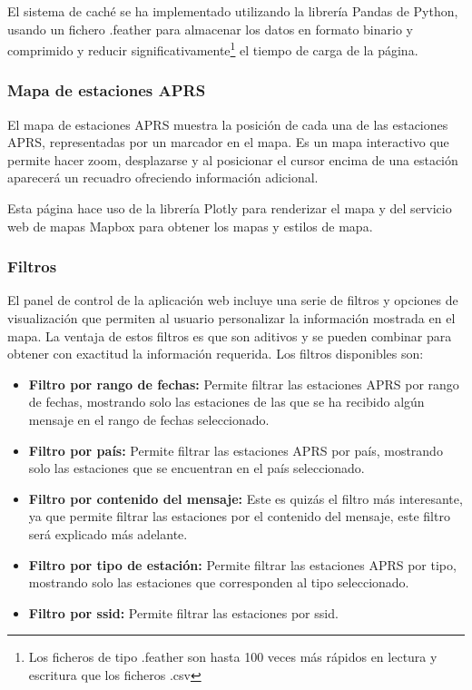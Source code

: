 El sistema de caché se ha implementado utilizando la librería Pandas de Python, usando un fichero .feather para almacenar los datos en formato binario y comprimido y reducir significativamente\footnote{Los ficheros de tipo .feather son hasta 100 veces más rápidos en lectura y escritura que los ficheros .csv\cite{CsvVsFeather}} el tiempo de carga de la página.

\subsubsection*{Mapa de estaciones APRS}

El mapa de estaciones APRS muestra la posición de cada una de las estaciones APRS, representadas por un marcador en el mapa. Es un mapa interactivo que permite hacer zoom, desplazarse y al posicionar el cursor encima de una estación aparecerá un recuadro ofreciendo información adicional.

Esta página hace uso de la librería Plotly para renderizar el mapa y del servicio web de mapas Mapbox para obtener los mapas y estilos de mapa.

\subsubsection*{Filtros}
El panel de control de la aplicación web incluye una serie de filtros y opciones de visualización que permiten al usuario personalizar la información mostrada en el mapa. La ventaja de estos filtros es que son aditivos y se pueden combinar para obtener con exactitud la información requerida. Los filtros disponibles son:

\begin{itemize}
	\item \textbf{Filtro por rango de fechas:} Permite filtrar las estaciones APRS por rango de fechas, mostrando solo las estaciones de las que se ha recibido algún mensaje en el rango de fechas seleccionado.
	\item \textbf{Filtro por país:} Permite filtrar las estaciones APRS por país, mostrando solo las estaciones que se encuentran en el país seleccionado.
	\item \textbf{Filtro por contenido del mensaje:} Este es quizás el filtro más interesante, ya que permite filtrar las estaciones por el contenido del mensaje, este filtro será explicado más adelante.
	\item \textbf{Filtro por tipo de estación:} Permite filtrar las estaciones APRS por tipo, mostrando solo las estaciones que corresponden al tipo seleccionado.
	\item \textbf{Filtro por ssid:} Permite filtrar las estaciones por ssid.
\end{itemize}

